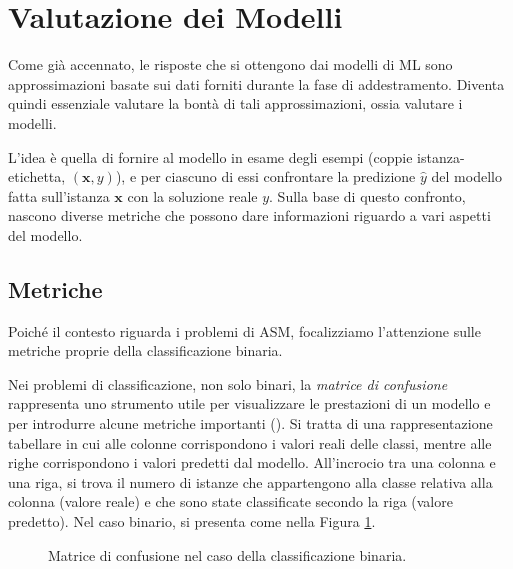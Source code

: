 \section{Valutazione dei Modelli}
Come già accennato, le risposte che si ottengono dai modelli di ML sono approssimazioni basate sui dati forniti durante la fase di addestramento. Diventa quindi essenziale valutare la bontà di tali approssimazioni, ossia valutare i modelli.

L'idea è quella di fornire al modello in esame degli esempi (coppie istanza-etichetta, $(\mathbf{x},y)$), e per ciascuno di essi confrontare la predizione $\hat{y}$ del modello fatta sull'istanza $\mathbf{x}$ con la soluzione reale $y$. Sulla base di questo confronto, nascono diverse metriche che possono dare informazioni riguardo a vari aspetti del modello.

\subsection{Metriche}
\label{par:metriche}
Poiché il contesto riguarda i problemi di ASM, focalizziamo l'attenzione sulle metriche proprie della classificazione binaria.

Nei problemi di classificazione, non solo binari, la \textit{matrice di confusione} rappresenta uno strumento utile per visualizzare le prestazioni di un modello e per introdurre alcune metriche importanti (\cite{sokolova2009performance}).
Si tratta di una rappresentazione tabellare in cui alle colonne corrispondono i valori reali delle classi, mentre alle righe corrispondono i valori predetti dal modello. All'incrocio tra una colonna e una riga, si trova il numero di istanze che appartengono alla classe relativa alla colonna (valore reale) e che sono state classificate secondo la riga (valore predetto).
Nel caso binario, si presenta come nella Figura \ref{fig:confusion-matrix}.

\begin{figure}[h]
    \centering
    \begin{center}
\end{center}
    \caption{Matrice di confusione nel caso della classificazione binaria.}
    \label{fig:confusion-matrix}
\end{figure}

